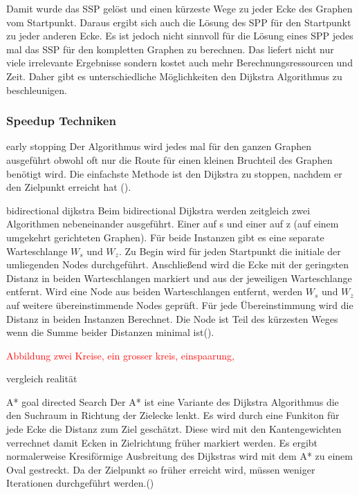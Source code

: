 \documentclass[10pt,a4paper]{article}
\newcommand\todo[1]{\textcolor{red}{#1}}
\begin{document}
Damit wurde das SSP gelöst und einen kürzeste Wege zu jeder Ecke des Graphen vom Startpunkt. Daraus ergibt sich auch die Lösung des SPP für den Startpunkt zu jeder anderen Ecke. Es ist jedoch nicht sinnvoll für die Lösung eines SPP jedes mal das SSP für den kompletten Graphen zu berechnen. Das liefert nicht nur viele irrelevante Ergebnisse sondern kostet auch mehr Berechnungsressourcen und Zeit. Daher gibt es unterschiedliche Möglichkeiten den Dijkstra Algorithmus zu beschleunigen.

\subsubsection{Speedup Techniken}

early stopping 
Der Algorithmus wird jedes mal für den ganzen Graphen ausgeführt obwohl oft nur die Route für einen kleinen Bruchteil des Graphen benötigt wird. Die einfachste Methode ist den Dijkstra zu stoppen, nachdem er den Zielpunkt erreicht hat (\cite[209]{kurt}). 


bidirectional dijkstra
Beim bidirectional Dijkstra werden zeitgleich zwei Algorithmen nebeneinander ausgeführt. Einer auf s und einer auf z (auf einem umgekehrt gerichteten Graphen). Für beide Instanzen gibt es eine separate Warteschlange $W_{s}$ und $W_{z}$. Zu Begin wird für jeden Startpunkt die initiale der umliegenden Nodes durchgeführt. Anschließend wird die Ecke mit der geringsten Distanz in beiden Warteschlangen markiert und aus der jeweiligen Warteschlange entfernt. Wird eine Node aus beiden Warteschlangen entfernt, werden $W_{s}$ und $W_{z}$ auf weitere übereinstimmende Nodes geprüft. Für jede Übereinstimmung wird die Distanz in beiden Instanzen Berechnet. Die Node ist Teil des kürzesten Weges wenn die Summe beider Distanzen minimal ist(\cite[209f]{kurt}).

\todo{Abbildung zwei Kreise, ein grosser kreis, einspaarung,}

vergleich realität

A*
goal directed Search
Der A* ist eine Variante des Dijkstra Algorithmus die den Suchraum in Richtung der Zielecke lenkt. Es wird durch eine Funkiton für jede Ecke die Distanz zum Ziel geschätzt. Diese wird mit den Kantengewichten verrechnet damit Ecken in Zielrichtung früher markiert werden. Es ergibt normalerweise Kresiförmige Ausbreitung des Dijkstras wird mit dem A* zu einem Oval gestreckt. Da der Zielpunkt so früher erreicht wird, müssen weniger Iterationen durchgeführt werden.(\cite[210f]{kurt})
\end{document}
